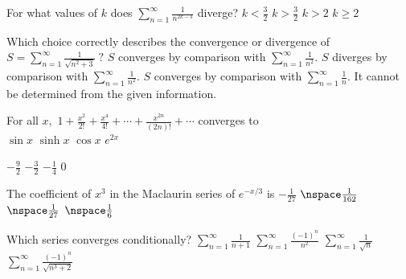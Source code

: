 \begin{question}
For what values of \(k\) does \(\sum_{n = 1}^\infty \frac{1}{n^{2k - 3}}\) diverge?
\choices
{}
{\(k < \frac{3}{2}\)}
{\(k > \frac{3}{2}\)}
{\(k > 2\)}
{\(k \geqslant 2\)}
\end{question}

\begin{question}
Which choice correctly describes the convergence or divergence of \(S = \sum_{n = 1}^\infty \frac{1}{\sqrt{n^2 + 3}} \; ?\)
\choices
{\(S\) converges by comparison with \(\sum_{n = 1}^\infty \frac{1}{n^2}.\)}
{\(S\) diverges by comparison with \(\sum_{n = 1}^\infty \frac{1}{n^2}.\)}
{\(S\) converges by comparison with \(\sum_{n = 1}^\infty \frac{1}{n}.\)}
{}
{It cannot be determined from the given information.}
\end{question}

\begin{question}
For all \(x,\) \(1 + \frac{x^2}{2!} + \frac{x^4}{4!} + \cdots + \frac{x^{2n}}{(2n)!} + \cdots\) \; converges to \\
\choicesline
{\(\sin x\)}
{}
{\(\sinh x\)}
{\(\cos x\)}
{\(e^{2x}\)}
\end{question}

\begin{question}
\choicesline
{}
{\(-\frac{9}{2}\)}
{\(-\frac{3}{2}\)}
{\(-\frac{1}{4}\)}
{0}
\end{question}

\begin{question}
The coefficient of \(x^3\) in the Maclaurin series of \(e^{-x/3}\) is 
\choicesline
{\(-\frac{1}{27}\)}
{}
{\(\nspace \frac{1}{162}\)}
{\( \nspace \frac{1}{27}\)}
{\( \nspace \frac{1}{6}\)}
\end{question}

\begin{question}
Which series converges conditionally?
\choices
{\(\sum_{n = 1}^\infty \frac{1}{n + 1}\)}
{\(\sum_{n = 1}^\infty \frac{(-1)^n}{n^2}\)}
{}
{\(\sum_{n = 1}^\infty \frac{1}{\sqrt{n}}\)}
{\(\sum_{n = 1}^\infty \frac{(-1)^n}{\sqrt{n^3 + 2}}\)}
\end{question}


